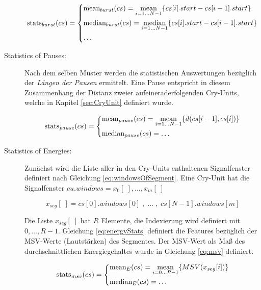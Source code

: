 \begin{description}
\begin{equation}
\text{stats}_{burst}(cs) = 
\begin{dcases}
\text{mean}_{burst}(cs) = \operatorname*{mean}_{i = 1 \ldots N-1}\{cs[i].start - cs[i-1].start\} \\
\text{median}_{burst}(cs) = \operatorname*{median}_{i = 1 \ldots N-1}\{cs[i].start - cs[i-1].start\} \\
\ldots
\end{dcases}
\label{eq:featuresOfBursts}
\end{equation}

\item[Statistics of Pauses:] Nach dem selben Muster werden die statistischen Auswertungen bezüglich der  \emph{Längen der Pausen} ermittelt. Eine Pause entspricht in diesem Zusammenhang der Distanz zweier aufeineraderfolgenden Cry-Units, welche in Kapitel \ref{sec:CryUnit} definiert wurde.

\begin{equation}
\text{stats}_{pause}(cs) = 
\begin{dcases}
\text{mean}_{pause}(cs) = \operatorname*{mean}_{i = 1 \ldots N-1}\{d(cs[i-1],cs[i])\} \\
\text{median}_{pause}(cs)  = \ldots
\end{dcases}
\end{equation}

\item[Statistics of Energies:] Zunächst wird die Liste aller in den Cry-Units enthaltenen Signalfenster definiert nach Gleichung \ref{eq:windowsOfSegment}. Eine Cry-Unit hat die Signalfenster $cu.windows = x_0[\;],\ldots,x_m[\;]$

\begin{equation}
x_{seg}[\; ] = cs[0].windows[0] \;  , \; \ldots \; , \; cs[N-1].windows[m] 
\label{eq:windowsOfSegment}
\end{equation}

Die Liste $x_{seg}[\; ]$ hat $R$ Elemente, die Indexierung wird definiert mit $0, \ldots, R-1$. Gleichung \ref{eq:energyStats} definiert die Features bezüglich der MSV-Werte (\glqq Lautstärken\grqq ) des Segmentes. Der MSV-Wert als Maß des durchschnittlichen Energiegehaltes wurde in Gleichung \ref{eq:msv} definiert.

\begin{equation}
\text{stats}_{msv}(cs) = 
\begin{dcases}
\text{mean}_{E}(cs) = \operatorname*{mean}_{i = 0 \ldots R-1}\{MSV(x_{seg}[i])\} \\
\text{median}_{E}(cs)  = \ldots
\end{dcases}
\label{eq:energyStats}
\end{equation}

\end{description}

